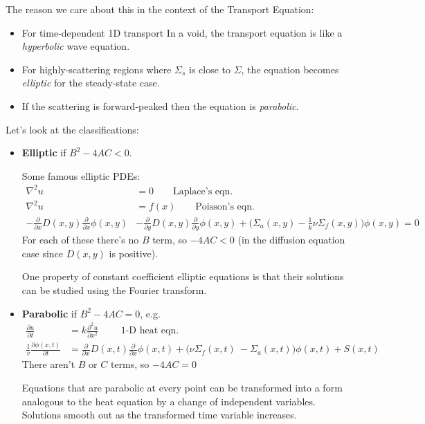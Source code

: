 \documentclass[12pt]{article}
\newcommand{\Macro}{\ensuremath{\Sigma}}
\begin{document}
\noindent The reason we care about this in the context of the Transport Equation:
\begin{itemize}
\item For time-dependent 1D transport In a void, the transport equation is like a \textit{hyperbolic} wave equation. 
\item For highly-scattering regions where $\Macro_{s}$ is close to $\Macro$, the equation becomes \textit{elliptic} for the steady-state case. 
\item If the scattering is forward-peaked then the equation is \textit{parabolic}.
\end{itemize}

Let's look at the classifications:
\begin{itemize}
\item \textbf{Elliptic} if $B^2 - 4 AC < 0$. %

Some famous elliptic PDEs:
\begin{align*}
\nabla^2 u &= 0 \qquad \text{Laplace's eqn.} \nonumber \\
\nabla^2 u &= f(x) \qquad \text{Poisson's eqn.} \nonumber \\
-\frac{\partial}{\partial x}D(x,y)\frac{\partial}{\partial x}\phi(x,y) &- \frac{\partial}{\partial y}D(x,y)\frac{\partial}{\partial y}\phi(x,y) + \bigl(\Macro_a(x,y) - \frac{1}{k} \nu \Macro_f(x,y)\bigr) \phi(x,y) = 0\nonumber
\end{align*}
For each of these there's no $B$ term, so $-4AC < 0$ (in the diffusion equation case since $D(x,y)$ is positive).

One property of constant coefficient elliptic equations is that their solutions can be studied using the Fourier transform. %

\item \textbf{Parabolic} if $B^2 - 4 AC = 0$, e.g.
\begin{align}
\frac{\partial u}{\partial t} &= k \frac{\partial^2 u}{\partial x^2} \qquad \text{ 1-D heat eqn.} \nonumber \\
\frac{1}{v}\frac{\partial \phi(x,t)}{\partial t} &= \frac{\partial}{\partial x}D(x,t)\frac{\partial}{\partial x}\phi(x,t) + \bigl(\nu \Macro_f(x,t)\ - \Macro_a(x,t)\bigr) \phi(x,t) + S(x,t)\nonumber
\end{align}
There aren't $B$ or $C$ terms, so $-4AC = 0$

Equations that are parabolic at every point can be transformed into a form analogous to the heat equation by a change of independent variables. Solutions smooth out as the transformed time variable increases.
\end{itemize}
\end{document}
